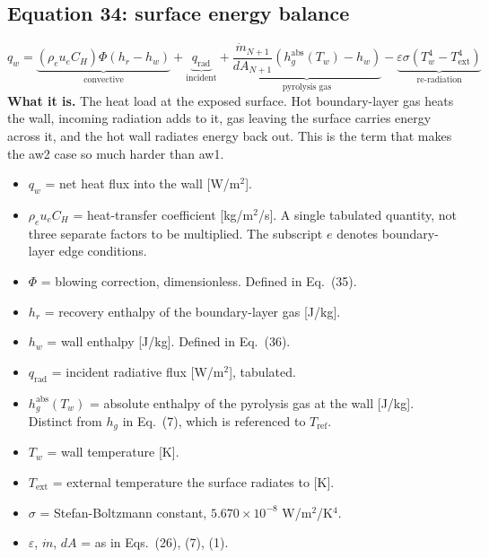 \documentclass[11pt]{article}
\begin{document}
\subsection*{Equation 34: surface energy balance}
\begin{equation}
q_w = \underbrace{\left(\rho_e u_e C_H\right) \Phi \left(h_r - h_w\right)}_{\text{convective}}
    + \underbrace{q_{\mathrm{rad}}}_{\text{incident}}
    + \underbrace{\frac{\dot m_{N+1}}{dA_{N+1}}\left(h_g^{\mathrm{abs}}(T_w) - h_w\right)}_{\text{pyrolysis gas}}
    - \underbrace{\varepsilon \sigma \left(T_w^4 - T_{\mathrm{ext}}^4\right)}_{\text{re-radiation}}
\end{equation}
\textbf{What it is.} The heat load at the exposed surface. Hot boundary-layer gas
heats the wall, incoming radiation adds to it, gas leaving the surface carries
energy across it, and the hot wall radiates energy back out. This is the term that
makes the aw2 case so much harder than aw1.
\begin{itemize}
  \item $q_w$ = net heat flux into the wall [W/m$^2$].
  \item $\rho_e u_e C_H$ = heat-transfer coefficient [kg/m$^2$/s]. A single
        tabulated quantity, not three separate factors to be multiplied. The
        subscript $e$ denotes boundary-layer edge conditions.
  \item $\Phi$ = blowing correction, dimensionless. Defined in Eq.~(35).
  \item $h_r$ = recovery enthalpy of the boundary-layer gas [J/kg].
  \item $h_w$ = wall enthalpy [J/kg]. Defined in Eq.~(36).
  \item $q_{\mathrm{rad}}$ = incident radiative flux [W/m$^2$], tabulated.
  \item $h_g^{\mathrm{abs}}(T_w)$ = absolute enthalpy of the pyrolysis gas at the
        wall [J/kg]. Distinct from $h_g$ in Eq.~(7), which is referenced to
        $T_{\mathrm{ref}}$.
  \item $T_w$ = wall temperature [K].
  \item $T_{\mathrm{ext}}$ = external temperature the surface radiates to [K].
  \item $\sigma$ = Stefan-Boltzmann constant, $5.670 \times 10^{-8}$
        W/m$^2$/K$^4$.
  \item $\varepsilon$, $\dot m$, $dA$ = as in Eqs.~(26), (7), (1).
\end{itemize}
\end{document}
